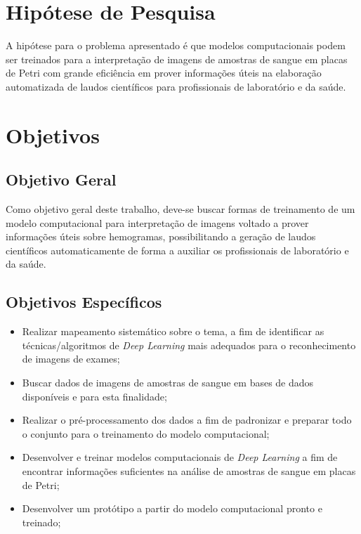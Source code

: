 \section{Hipótese de Pesquisa}
\label{sec:hipotese}

A hipótese para o problema apresentado é que modelos computacionais podem ser treinados para a interpretação de imagens de amostras de sangue em placas de Petri com grande eficiência em prover informações úteis na elaboração automatizada de laudos científicos para profissionais de laboratório e da saúde.


\section{Objetivos}
\label{sec:objetivos}

\subsection{Objetivo Geral}
Como objetivo geral deste trabalho, deve-se buscar formas de treinamento de um modelo computacional para interpretação de imagens voltado a prover informações úteis sobre hemogramas, possibilitando a geração de laudos científicos automaticamente de forma a auxiliar os profissionais de laboratório e da saúde.


\subsection{Objetivos Específicos}
\begin{itemize}
	\item Realizar mapeamento sistemático sobre o tema, a fim de identificar as técnicas/algoritmos de \emph{Deep Learning} mais adequados para o reconhecimento de imagens de exames;
	\item Buscar dados de imagens de amostras de sangue em bases de dados disponíveis e para esta finalidade;
	\item Realizar o pré-processamento dos dados a fim de padronizar e preparar todo o conjunto para o treinamento do modelo computacional;
	\item Desenvolver e treinar modelos computacionais de \emph{Deep Learning} a fim de encontrar informações suficientes na análise de amostras de sangue em placas de Petri;
	\item Desenvolver um protótipo a partir do modelo computacional pronto e treinado;
\end{itemize}

